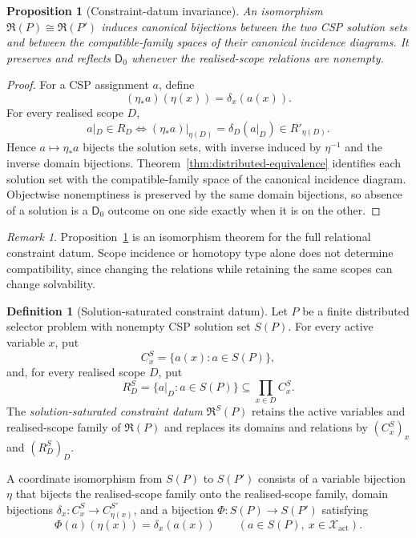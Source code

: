 \documentclass[11pt]{article}
\theoremstyle{plain}
\newtheorem{proposition}[theorem]{Proposition}
\theoremstyle{definition}
\newtheorem{definition}[theorem]{Definition}
\theoremstyle{remark}
\newtheorem{remark}[theorem]{Remark}
\begin{document}
\begin{proposition}[Constraint-datum invariance]\label{prop:constraint-invariance}
An isomorphism $\mathfrak R(P)\cong\mathfrak R(P')$ induces canonical
bijections between the two CSP solution sets and between the compatible-family
spaces of their canonical incidence diagrams. It preserves and reflects
$\mathsf D_0$ whenever the realised-scope relations are nonempty.
\end{proposition}

\begin{proof}
For a CSP assignment $a$, define
\[
(\eta_*a)(\eta(x))=\delta_x(a(x)).
\]
For every realised scope $D$,
\[
a|_D\in R_D
\iff
(\eta_*a)|_{\eta(D)}=\delta_D(a|_D)\in R'_{\eta(D)}.
\]
Hence $a\mapsto\eta_*a$ bijects the solution sets, with inverse induced by
$\eta^{-1}$ and the inverse domain bijections. Theorem~\ref{thm:distributed-equivalence}
identifies each solution set with the compatible-family space of the canonical
incidence diagram. Objectwise nonemptiness is preserved by the same domain
bijections, so absence of a solution is a $\mathsf D_0$ outcome on one side
exactly when it is on the other.
\end{proof}

\begin{remark}
Proposition~\ref{prop:constraint-invariance} is an isomorphism theorem for the
full relational constraint datum. Scope incidence or homotopy type alone does
not determine compatibility, since changing the relations while retaining the
same scopes can change solvability.
\end{remark}


\begin{definition}[Solution-saturated constraint datum]
\label{def:saturated-constraint-datum}
Let $P$ be a finite distributed selector problem with nonempty CSP solution set
$S(P)$. For every active variable $x$, put
\[
C_x^{S}=\{a(x):a\in S(P)\},
\]
and, for every realised scope $D$, put
\[
R_D^{S}=\{a|_D:a\in S(P)\}
\subseteq\prod_{x\in D}C_x^{S}.
\]
The \emph{solution-saturated constraint datum}
$\mathfrak R^{S}(P)$ retains the active variables and realised-scope family of
$\mathfrak R(P)$ and replaces its domains and relations by
$(C_x^{S})_x$ and $(R_D^{S})_D$.

A coordinate isomorphism from $S(P)$ to $S(P')$ consists of a variable
bijection $\eta$ that bijects the realised-scope family onto the realised-scope
family, domain bijections
$\delta_x:C_x^{S}\to C_{\eta(x)}^{S'}$, and a bijection
$\Phi:S(P)\to S(P')$ satisfying
\[
\Phi(a)(\eta(x))=\delta_x(a(x))
\qquad(a\in S(P),\ x\in\mathcal X_{\mathrm{act}}).
\]
\end{definition}
\end{document}
